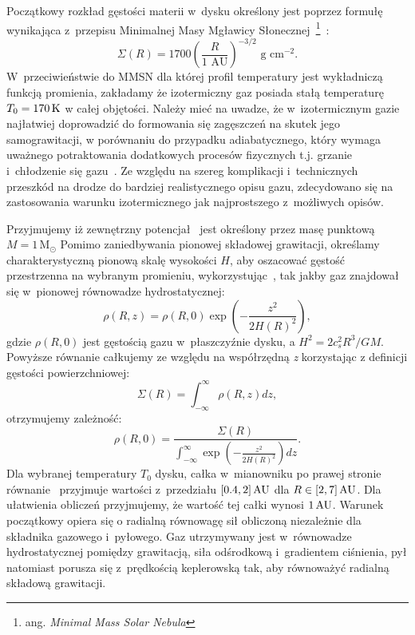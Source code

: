 \par Początkowy rozkład gęstości materii w~dysku określony jest poprzez formułę
wynikająca z~przepisu Minimalnej Masy Mgławicy Słonecznej~\footnote{ang.
\emph{Minimal Mass Solar Nebula}}~\cite{H81}:
\begin{equation}\label{eq:mmsn}
   \Sigma(R) = 1700 \left(\frac{R}{1\textrm{ AU}}\right)^{-3/2} 
   \textrm{ g cm}^{-2}.
\end{equation}
W~przeciwieństwie do MMSN dla której profil temperatury jest wykładniczą funkcją
promienia, zakładamy że izotermiczny gaz posiada stałą temperaturę $T_0 = 170\hbox{$\thinspace\textrm{K}$}$
w całej objętości. Należy mieć na uwadze, że w~izotermicznym gazie najłatwiej
doprowadzić do formowania się zagęszczeń na skutek jego samograwitacji, w
porównaniu do przypadku adiabatycznego, który wymaga uważnego potraktowania
dodatkowych procesów fizycznych t.j. grzanie i~chłodzenie się gazu~\cite{Nel00}.
Ze względu na szereg komplikacji i~technicznych przeszkód na drodze do bardziej
realistycznego opisu gazu, zdecydowano się na zastosowania warunku
izotermicznego jak najprostszego z~możliwych opisów.
\par Przyjmujemy iż zewnętrzny potencjał~ jest określony przez
masę punktową $M=1\,\textrm{M}_\odot$ Pomimo zaniedbywania pionowej składowej
grawitacji, określamy charakterystyczną pionową skalę wysokości $H$, aby
oszacować gęstość przestrzenna na wybranym promieniu,
wykorzystując~, tak jakby gaz znajdował się w~pionowej równowadze
hydrostatycznej:
%
\begin{equation}\label{eq:rhoR}
   \rho(R,z) =  \rho(R,0) \exp\left(-\frac{z^2}{2H(R)^2}\right),
\end{equation}
gdzie $\rho(R,0)$ jest gęstością gazu w~płaszczyźnie dysku, a $H^2 = 2 c_s^2 R^3/
GM$.
%
Powyższe równanie całkujemy ze względu na współrzędną \emph{z} korzystając z
definicji gęstości powierzchniowej:
\begin{equation} \label{eq:sigmaR}
   \Sigma(R) = \int_{-\infty}^\infty \rho(R,z) dz,
\end{equation}
%
otrzymujemy zależność:
\begin{equation}
   \label{eq:rho}
    \rho(R,0) = \frac{\Sigma(R) }{\int_{-\infty}^\infty
   \exp\left(-\frac{z^2}{2H(R)^2}\right) dz}.
\end{equation}
Dla wybranej temperatury $T_0$ dysku, całka w~mianowniku po prawej stronie
równanie~ przyjmuje wartości z~przedziału $[0.4,2]\hbox{$\thinspace\textrm{AU}$}$ dla $R \in
[2,7]\hbox{$\thinspace\textrm{AU}$}$. Dla ułatwienia obliczeń przyjmujemy, że wartość tej całki wynosi $1\hbox{$\thinspace\textrm{AU}$}$.
Warunek początkowy opiera się o radialną równowagę sił obliczoną niezależnie dla
składnika gazowego i~pyłowego. Gaz utrzymywany jest w~równowadze hydrostatycznej
pomiędzy grawitacją, siła odśrodkową i~gradientem ciśnienia, pył natomiast
porusza się z~prędkością keplerowską tak, aby równoważyć radialną składową
grawitacji.

